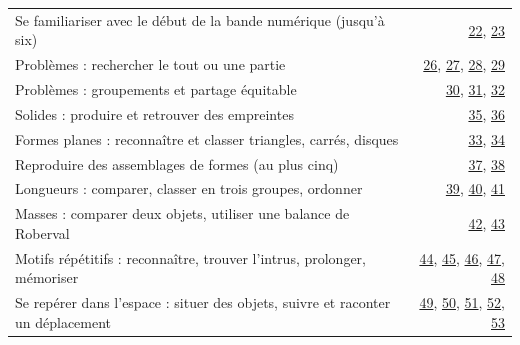 {\begin{tabularx}{\linewidth}{@{}Xr@{}}
Se familiariser avec le début de la bande numérique (jusqu’à six) & \hyperref[act-ms-22]{22}, \hyperref[act-ms-23]{23}\\[1.6mm]
Problèmes : rechercher le tout ou une partie & \hyperref[act-ms-26]{26}, \hyperref[act-ms-27]{27}, \hyperref[act-ms-28]{28}, \hyperref[act-ms-29]{29}\\[1.6mm]
Problèmes : groupements et partage équitable & \hyperref[act-ms-30]{30}, \hyperref[act-ms-31]{31}, \hyperref[act-ms-32]{32}\\[1.6mm]
Solides : produire et retrouver des empreintes & \hyperref[act-ms-35]{35}, \hyperref[act-ms-36]{36}\\[1.6mm]
Formes planes : reconnaître et classer triangles, carrés, disques & \hyperref[act-ms-33]{33}, \hyperref[act-ms-34]{34}\\[1.6mm]
Reproduire des assemblages de formes (au plus cinq) & \hyperref[act-ms-37]{37}, \hyperref[act-ms-38]{38}\\[1.6mm]
Longueurs : comparer, classer en trois groupes, ordonner & \hyperref[act-ms-39]{39}, \hyperref[act-ms-40]{40}, \hyperref[act-ms-41]{41}\\[1.6mm]
Masses : comparer deux objets, utiliser une balance de Roberval & \hyperref[act-ms-42]{42}, \hyperref[act-ms-43]{43}\\[1.6mm]
Motifs répétitifs : reconnaître, trouver l’intrus, prolonger, mémoriser & \hyperref[act-ms-44]{44}, \hyperref[act-ms-45]{45}, \hyperref[act-ms-46]{46}, \hyperref[act-ms-47]{47}, \hyperref[act-ms-48]{48}\\[1.6mm]
Se repérer dans l’espace : situer des objets, suivre et raconter un déplacement & \hyperref[act-ms-49]{49}, \hyperref[act-ms-50]{50}, \hyperref[act-ms-51]{51}, \hyperref[act-ms-52]{52}, \hyperref[act-ms-53]{53}\\[1.6mm]
\bottomrule\end{tabularx}\par}
